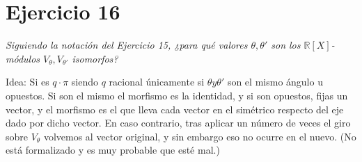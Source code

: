 \section{Ejercicio 16}%
\label{sec:ejercicio_16}
\textit{Siguiendo la notación del Ejercicio 15, ¿para qué valores \(\theta, \theta'\) son los \(\mathbb{R}[X]\)-módulos \(V_\theta, V_{\theta'}\) isomorfos?}

Idea: Si es \(q \cdot \pi\) siendo \(q\) racional únicamente si \(\theta y \theta'\) son el mismo ángulo u opuestos. Si son el mismo el morfismo es la identidad, y si son opuestos, fijas un vector, y el morfismo es el que lleva cada vector en el simétrico respecto del eje dado por dicho vector. En caso contrario, tras aplicar un número de veces el giro sobre \(V_\theta\) volvemos al vector original, y sin embargo eso no ocurre en el nuevo. (No está formalizado y es muy probable que esté mal.)
